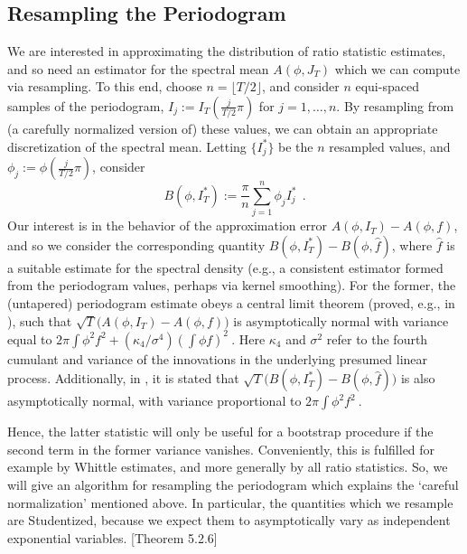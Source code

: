 \subsection*{Resampling the Periodogram}
We are interested in approximating the distribution of ratio statistic estimates, and so need an estimator for the spectral mean $A(\phi,J_T)$ which we can compute via resampling. To this end, choose $n = \lfloor T/2\rfloor$, and consider $n$ equi-spaced samples of the periodogram, $I_j := I_T(\frac{j}{T/2}\pi)$ for $j=1,\ldots,n$. By resampling from (a carefully normalized version of) these values, we can obtain an appropriate discretization of the spectral mean. Letting $\{I_j^*\}$ be the $n$ resampled values, and $\phi_j := \phi(\frac{j}{T/2}\pi)$, consider
$$
B(\phi,I_T^*) := \frac{\pi}{n} \sum_{j=1}^n \phi_j I_j^*~~.
$$
Our interest is in the behavior of the approximation error $A(\phi,I_T) - A(\phi,f)$, and so we consider the corresponding quantity $B(\phi,I_T^*) - B(\phi,\hat f)$, where $\hat f$ is a suitable estimate for the spectral density (e.g., a consistent estimator formed from the periodogram values, perhaps via kernel smoothing). For the former, the (untapered) periodogram estimate obeys a central limit theorem (proved, e.g., in \cite{dahlhauslimitlaw}), such that $\sqrt T \bigl( A(\phi,I_T) - A(\phi,f)\bigr)$ is asymptotically normal with variance equal to $2\pi \int \phi^2 f^2 + (\kappa_4 / \sigma^4)\left(\int \phi f\right)^2~$. Here $\kappa_4$ and $\sigma^2$ refer to the fourth cumulant and variance of the innovations in the underlying presumed linear process. Additionally, in \cite{bootstrap}, it is stated that $\sqrt T \bigl( B(\phi,I_T^*) - B(\phi,\hat f)\bigr)$ is also asymptotically normal, with variance proportional to $2\pi \int \phi^2 f^2~$.

Hence, the latter statistic will only be useful for a bootstrap procedure if the second term in the former variance vanishes. Conveniently, this is fulfilled for example by Whittle estimates, and more generally by all ratio statistics. So, we will give an algorithm for resampling the periodogram which explains the `careful normalization' mentioned above. In particular, the quantities which we resample are Studentized, because we expect them to asymptotically vary as independent exponential variables. \cite{brillinger}[Theorem 5.2.6] \\

